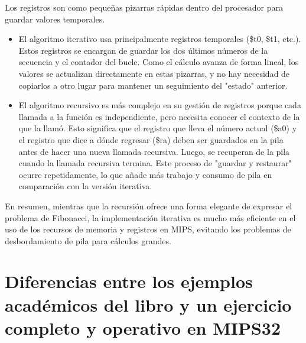 \documentclass{article}
\begin{document}
Los registros son como pequeñas pizarras rápidas dentro del procesador para guardar valores temporales.
\begin{itemize}
    \item El algoritmo iterativo usa principalmente registros temporales (\$t0, \$t1, etc.). Estos registros se encargan de guardar los dos últimos números de la secuencia y el contador del bucle. Como el cálculo avanza de forma lineal, los valores se actualizan directamente en estas pizarras, y no hay necesidad de copiarlos a otro lugar para mantener un seguimiento del "estado" anterior.
    \item El algoritmo recursivo es más complejo en su gestión de registros porque cada llamada a la función es independiente, pero necesita conocer el contexto de la que la llamó. Esto significa que el registro que lleva el número actual (\$a0) y el registro que dice a dónde regresar (\$ra) deben ser guardados en la pila antes de hacer una nueva llamada recursiva. Luego, se recuperan de la pila cuando la llamada recursiva termina. Este proceso de "guardar y restaurar" ocurre repetidamente, lo que añade más trabajo y consumo de pila en comparación con la versión iterativa.
\end{itemize}
En resumen, mientras que la recursión ofrece una forma elegante de expresar el problema de Fibonacci, la implementación iterativa es mucho más eficiente en el uso de los recursos de memoria y registros en MIPS, evitando los problemas de desbordamiento de pila para cálculos grandes.

\section*{Diferencias entre los ejemplos académicos del libro y un ejercicio completo y operativo en MIPS32}
\end{document}
